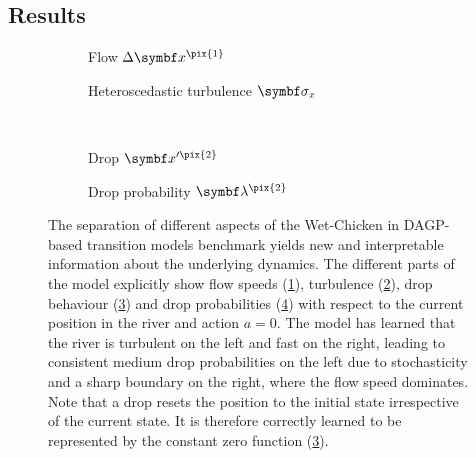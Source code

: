 \subsection{Results}
\label{sub:interpretable_reinforcement_learning:results}
\begin{figure}[tp]
    \centering
    \begin{subfigure}[b]{\halffigurewidth}
        \centering
        
        \caption{
        \label{fig:interpretable_reinforcement_learning:wetchicken:speed}
        Flow $\Delta\mat{x}^{\pix{1}}$
        }
    \end{subfigure}
    \hfill
    \begin{subfigure}[b]{\halffigurewidth}
        \centering
        
        \caption{
            \label{fig:interpretable_reinforcement_learning:wetchicken:hetero}
            Heteroscedastic turbulence $\mat{\sigma}_x$
        }
    \end{subfigure}\\[\figureskip]
    \begin{subfigure}[b]{\halffigurewidth}
        \centering
        
        \caption{
        \label{fig:interpretable_reinforcement_learning:wetchicken:drop}
        Drop $\mat{x}^{\prime\pix{2}}$
        }
    \end{subfigure}
    \hfill
    \begin{subfigure}[b]{\halffigurewidth}
        \centering
        
        \caption{
        \label{fig:interpretable_reinforcement_learning:wetchicken:falldown}
        Drop probability $\mat{\lambda}^{\pix{2}}$
        }
    \end{subfigure}
    \caption{
        \label{fig:interpretable_reinforcement_learning:wetchicken:dynamics}
        The separation of different aspects of the Wet-Chicken in DAGP-based transition models benchmark yields new and interpretable information about the underlying dynamics.
        The different parts of the model explicitly show flow speeds (\cref{fig:interpretable_reinforcement_learning:wetchicken:speed}), turbulence (\cref{fig:interpretable_reinforcement_learning:wetchicken:hetero}), drop behaviour (\cref{fig:interpretable_reinforcement_learning:wetchicken:drop}) and drop probabilities (\cref{fig:interpretable_reinforcement_learning:wetchicken:falldown}) with respect to the current position in the river and action $a = 0$.
        The model has learned that the river is turbulent on the left and fast on the right, leading to consistent medium drop probabilities on the left due to stochasticity and a sharp boundary on the right, where the flow speed dominates.
        Note that a drop resets the position to the initial state irrespective of the current state.
        It is therefore correctly learned to be represented by the constant zero function (\cref{fig:interpretable_reinforcement_learning:wetchicken:drop}).
    }
\end{figure}
